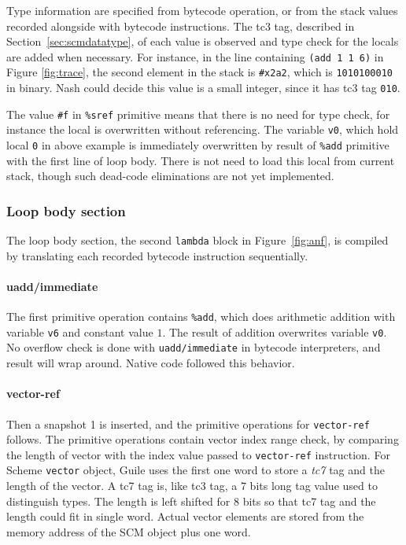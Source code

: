 \documentclass[preprint, 10pt]{sigplanconf}
\begin{document}
Type information are specified from bytecode operation, or from the stack values
recorded alongside with bytecode instructions. The tc3 tag, described in
Section~\ref{sec:scmdatatype}, of each value is observed and type check for the
locals are added when necessary. For instance, in the line containing
\texttt{(add~1~1~6)} in Figure \hyperref[fig:trace]{\ref{fig:trace}}, the second
element in the stack is \texttt{\#x2a2}, which is \texttt{1010100010} in
binary. Nash could decide this value is a small integer, since it has tc3 tag
\texttt{010}.

The value \texttt{\#f} in \texttt{\%sref} primitive means that there is no need
for type check, for instance the local is overwritten without referencing. The
variable \texttt{v0}, which hold local \texttt{0} in above example is
immediately overwritten by result of \texttt{\%add} primitive with the first
line of loop body. There is not need to load this local from current stack,
though such dead-code eliminations are not yet implemented.

\subsubsection{Loop body section}

The loop body section, the second \texttt{lambda} block in
Figure~\hyperref[fig:anf]{\ref{fig:anf}}, is compiled by translating each
recorded bytecode instruction sequentially.

\paragraph{uadd/immediate} The first primitive operation contains
\texttt{\%add}, which does arithmetic addition with variable \texttt{v6} and
constant value $1$. The result of addition overwrites variable \texttt{v0}. No
overflow check is done with \texttt{uadd/immediate} in bytecode interpreters,
and result will wrap around. Native code followed this behavior.

\paragraph{vector-ref} Then a snapshot 1 is inserted, and
the primitive operations for \texttt{vector-ref} follows. The primitive
operations contain vector index range check, by comparing the length of vector
with the index value passed to \texttt{vector-ref} instruction. For Scheme
\texttt{vector} object, Guile uses the first one word to store a \textit{tc7}
tag and the length of the vector. A tc7 tag is, like tc3 tag, a 7 bits long tag
value used to distinguish types. The length is left shifted for 8 bits so that
tc7 tag and the length could fit in single word. Actual vector elements are
stored from the memory address of the SCM object plus one word.
\end{document}
